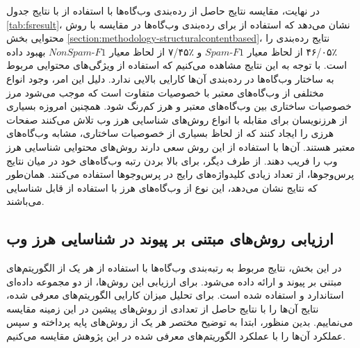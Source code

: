 \documentclass[twoside, a4paper,11pt]{book}
\numberwithin{equation}{chapter}
\numberwithin{table}{chapter}
\numberwithin{figure}{chapter}
\numberwithin{equation}{chapter}
\begin{document}
در نهایت، مقایسه نتایج حاصل از رده‌بندی وب‌گاه‌ها با استفاده از  با نتایج جدول \ref{tab:fsresult}، نشان می‌دهد که استفاده از  برای رده‌بندی وب‌گاه‌ها در مقایسه با روش محتوایی بخش \ref{section:methodology-structuralcontentbased}، نتایج رده‌بندی را ٪۴۶/۰۵ از لحاظ معیار $Spam\text{-}F1$ و ٪۷/۴۵ از لحاظ معیار $NonSpam\text{-}F1$ بهبود داده است. با توجه به این نتایج مشاهده می‌کنیم که استفاده از ویژگی‌های محتوایی مربوط به ساختار وب‌گاه‌ها در رده‌بندی آن‌ها کارایی بالایی ندارد. دلیل این امر، وجود انواع مختلفی از وب‌گاه‌های معتبر با خصوصیات متفاوت است که موجب می‌شود مرز خصوصیات ساختاری بین وب‌گاه‌های معتبر و هرز کم‌رنگ شود. همچنین امروزه بسیاری از هرزنویسان برای مقابله با انواع روش‌های شناسایی هرز وب تلاش می‌کنند صفحات هرزی را ایجاد کنند که از لحاظ بسیاری از خصوصیات ساختاری، مشابه وب‌گاه‌های معتبر هستند. آن‌ها با استفاده از این روش‌ سعی دارند روش‌های محتوایی شناسایی هرز وب را فریب دهند. از طرف دیگر، برای بالا بردن رتبه وب‌گاه‌های خود در میان نتایج پرس‌وجوها، از تعداد زیادی کلیدواژه‌های رایج در پرس‌وجو‌ها استفاده می‌کنند. همان‌طور که نتایج نشان می‌دهد، این نوع از وب‌گاه‌های هرز با استفاده از  قابل شناسایی می‌باشند. 


\subsection{ارزیابی روش‌‌های مبتنی بر پیوند در شناسایی هرز وب}
\label{subsection:experiments-results-link}
در این بخش، نتایج مربوط به رتبه‌بندی وب‌گاه‌ها با استفاده از هر یک از الگوریتم‌های مبتنی بر پیوند  و  ارائه داده می‌شود. برای ارزیابی این روش‌ها، از دو مجموعه داده‌ای استاندارد  و  استفاده شده است. برای تحلیل میزان کارایی الگوریتم‌های معرفی شده، نتایج آن‌ها را با نتایج حاصل از تعدادی از روش‌های پیشین در این زمینه مقایسه می‌نماییم. بدین منظور، ابتدا به توضیح مختصر هر یک از روش‌های پایه پرداخته و سپس عملکرد آن‌ها را با عملکرد الگوریتم‌های معرفی شده در این پژوهش مقایسه می‌کنیم. 
\end{document}

